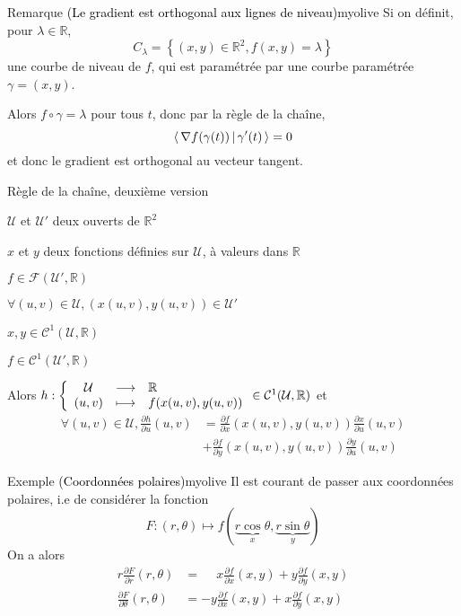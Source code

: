     \begin{omed}{Remarque \textcolor{black}{(Le gradient est orthogonal aux lignes de niveau)}}{myolive}
        Si on définit, pour $\lambda \in \mathbb{R}$, 
        \[ C_{\lambda} = \left\{ (x,y) \in \mathbb{R}^2, f(x,y) = \lambda  \right\}\] 
        une courbe de niveau de $f$, qui est paramétrée par une courbe paramétrée $\gamma = (x,y)$.

        Alors $f \circ \gamma = \lambda$ pour tous $t$, donc par la règle de la chaîne, 
        \[ \left<\,\nabla f(\gamma(t))\,\middle|\,\gamma'(t)\,\right> = 0 \] 
        et donc le gradient est orthogonal au vecteur tangent.
    \end{omed}

    \begin{prop}{Règle de la chaîne, deuxième version}{}
        \begin{soient}
            \item $\mathcal{U}$ et $\mathcal{U}'$ deux ouverts de $\mathbb{R}^2$
            \item $x$ et $y$ deux fonctions définies sur $\mathcal{U}$, à valeurs dans $\mathbb{R}$
            \item $f \in \mathcal{F}(\mathcal{U}',\mathbb{R})$
        \end{soient}
        \begin{suppose}
            \item $\forall (u,v) \in \mathcal{U}, \left(x(u,v),y(u,v)\right) \in \mathcal{U}'$
            \item $x,y \in \mathcal{C}^1 (\mathcal{U},\mathbb{R})$
            \item $ f \in \mathcal{C}^1 (\mathcal{U}',\mathbb{R})$
        \end{suppose}
        Alors $\fonction{h}{\mathcal{U}}{\mathbb{R}}{(u,v)}{f(x(u,v),y(u,v))} \in \mathcal{C}^1(\mathcal{U},\mathbb{R})$ et 
        \begin{align*}
            \forall (u,v) \in \mathcal{U}, \frac{\partial h}{\partial u}(u,v) &= \frac{\partial f}{\partial x}(x(u,v),y(u,v))\frac{\partial x}{\partial u}(u,v) \\ &+ \frac{\partial f}{\partial y}(x(u,v),y(u,v))\frac{\partial y}{\partial u}(u,v)
        \end{align*}
    \end{prop}

    \begin{omed}{Exemple \textcolor{black}{(Coordonnées polaires)}}{myolive}
        Il est courant de passer aux coordonnées polaires, i.e de considérer la fonction 
        \[F : (r,\theta) \mapsto f(\underbrace{r \cos \theta}_x,\underbrace{ r \sin \theta}_y) \]
        On a alors 
        \begin{align*}
            r \frac{\partial F}{\partial r}(r,\theta) &= \phantom{-}x \frac{\partial f}{\partial x}(x,y) + y \frac{\partial f}{\partial y}(x,y) \\
            \frac{\partial F}{\partial \theta}(r,\theta) &= -y \frac{\partial f}{\partial x}(x,y) + x \frac{\partial f}{\partial y}(x,y) \\
        \end{align*}
    \end{omed}

